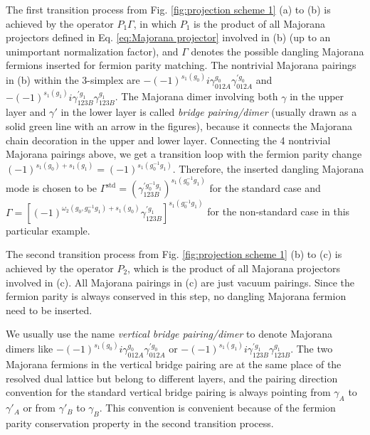 \documentclass[%
 reprint,
 amsmath,amssymb,
 aps,
prb,
]{revtex4-2}
\begin{document}
The first transition process from Fig. \ref{fig:projection scheme 1} (a) to (b) is achieved by the operator $P_1 \Gamma$, in which $P_1$ is the product of all Majorana projectors defined in Eq. \eqref{eq:Majorana projector} involved in (b) (up to an unimportant normalization factor), and $\Gamma$ denotes the possible dangling Majorana fermions inserted for fermion parity matching.
The nontrivial Majorana pairings in (b) within the 3-simplex are $-(-1)^{s_1(g_0)} i \gamma^{g_0}_{012A} \gamma^{\prime g_0}_{012A}$ and $-(-1)^{s_1(g_1)} i \gamma^{\prime g_1}_{123B} \gamma^{g_1}_{123B}$.
The Majorana dimer involving both $\gamma$ in the upper layer and $\gamma'$ in the lower layer is called \textit{bridge pairing/dimer} (usually drawn as a solid green line with an arrow in the figures), because it connects the Majorana chain decoration in the upper and lower layer.
Connecting the 4 nontrivial Majorana pairings above, we get a transition loop with the fermion parity change $(-1)^{s_1(g_0)+s_1(g_1)} = (-1)^{s_1(g^{-1}_0 g_1)}$.
Therefore, the inserted dangling Majorana mode is chosen to be $\Gamma^{\mathrm{std}} = (\gamma^{\prime g^{-1}_0 g_1}_{123B}) ^{s_1(g^{-1}_0 g_1)}$ for the standard case and $\Gamma = \left[ (-1) ^{\omega_2(g_0, g^{-1}_0 g_1) + s_1(g_0)} \gamma^{\prime g_1}_{123B} \right] ^{s_1(g^{-1}_0 g_1)}$ for the non-standard case in this particular example.

The second transition process from Fig. \ref{fig:projection scheme 1} (b) to (c) is achieved by the operator $P_2$, which is the product of all Majorana projectors involved in (c).
All Majorana pairings in (c) are just vacuum pairings.
Since the fermion parity is always conserved in this step, no dangling Majorana fermion need to be inserted.

We usually use the name \textit{vertical bridge pairing/dimer} to denote Majorana dimers like $-(-1)^{s_1(g_0)} i \gamma^{g_0}_{012A} \gamma^{\prime g_0}_{012A}$ or $-(-1)^{s_1(g_1)} i \gamma^{\prime g_1}_{123B} \gamma^{g_1}_{123B}$.
The two Majorana fermions in the vertical bridge pairing are at the same place of the resolved dual lattice but belong to different layers, and the pairing direction convention for the standard vertical bridge pairing is always pointing from $\gamma_A$ to $\gamma'_A$ or from $\gamma'_B$ to $\gamma_B$.
This convention is convenient because of the fermion parity conservation property in the second transition process.
\end{document}
